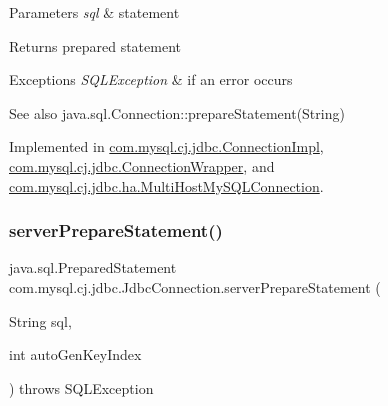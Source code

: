 \begin{DoxyParams}{Parameters}
{\em sql} & statement \\
\hline
\end{DoxyParams}
\begin{DoxyReturn}{Returns}
prepared statement 
\end{DoxyReturn}

\begin{DoxyExceptions}{Exceptions}
{\em S\+Q\+L\+Exception} & if an error occurs \\
\hline
\end{DoxyExceptions}
\begin{DoxySeeAlso}{See also}
java.\+sql.\+Connection\+::prepare\+Statement(\+String) 
\end{DoxySeeAlso}


Implemented in \mbox{\hyperlink{classcom_1_1mysql_1_1cj_1_1jdbc_1_1_connection_impl_ad91b5892ca4cc22ca40b2421171b0078}{com.\+mysql.\+cj.\+jdbc.\+Connection\+Impl}}, \mbox{\hyperlink{classcom_1_1mysql_1_1cj_1_1jdbc_1_1_connection_wrapper_aa430608c339c22aff456a59210faaf8b}{com.\+mysql.\+cj.\+jdbc.\+Connection\+Wrapper}}, and \mbox{\hyperlink{classcom_1_1mysql_1_1cj_1_1jdbc_1_1ha_1_1_multi_host_my_s_q_l_connection_a7db176300b273436df94f2cc48e986af}{com.\+mysql.\+cj.\+jdbc.\+ha.\+Multi\+Host\+My\+S\+Q\+L\+Connection}}.

\mbox{\label{interfacecom_1_1mysql_1_1cj_1_1jdbc_1_1_jdbc_connection_a9deb2cebf6538a53be5f24c52ee39f22}} 
\subsubsection{\texorpdfstring{server\+Prepare\+Statement()}{serverPrepareStatement()}\hspace{0.1cm}{\footnotesize\ttfamily [2/6]}}
{\footnotesize\ttfamily java.\+sql.\+Prepared\+Statement com.\+mysql.\+cj.\+jdbc.\+Jdbc\+Connection.\+server\+Prepare\+Statement (\begin{DoxyParamCaption}\item[{String}]{sql,  }\item[{int}]{auto\+Gen\+Key\+Index }\end{DoxyParamCaption}) throws S\+Q\+L\+Exception}

